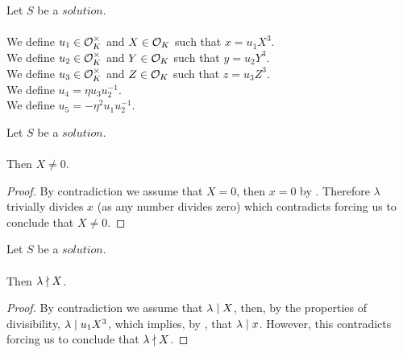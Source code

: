 \begin{definition}[$u_1,u_2,u_3,u_4,u_5,X,Y,Z$]
    \label{def:Solution_u1_u2_u3_u4_u5_X_Y_Z}
    \leanok
    Let $S$ be a $solution$.\\\\
    We define $u_1 \in \mathcal{O}^\times_K$ and $X \in \mathcal{O}_K$
    such that $x = u_1 X^3$.\\
    We define $u_2 \in \mathcal{O}^\times_K$ and $Y \in \mathcal{O}_K$
    such that $y = u_2 Y^3$.\\
    We define $u_3 \in \mathcal{O}^\times_K$ and $Z \in \mathcal{O}_K$
    such that $z = u_3 Z^3$.\\
    We define $u_4 = \eta u_3 u_2^{-1}$.\\
    We define $u_5 = -\eta^2 u_1 u_2^{-1}$.\\
\end{definition}

\begin{lemma}
    \label{lmm:X_ne_zero}
    \leanok
    Let $S$ be a $solution$.\\\\
    Then $X \neq 0$.
\end{lemma}
\begin{proof}
    \leanok
    By contradiction we assume that $X = 0$, then $x = 0$ by .
    Therefore $\lambda$ trivially divides $x$ (as any number divides zero) which contradicts
     forcing us to conclude that $X \neq 0$.
\end{proof}

\begin{lemma}
    \label{lmm:lambda_not_dvd_X}
    \leanok
    Let $S$ be a $solution$.\\\\
    Then $\lambda \nmid X$.
\end{lemma}
\begin{proof}
    \leanok
    By contradiction we assume that $\lambda \mid X$, then, by the properties of divisibility,
    $\lambda \mid u_1 X^3$, which implies, by ,
    that $\lambda \mid x$.
    However, this contradicts 
    forcing us to conclude that $\lambda \nmid X$.
\end{proof}


